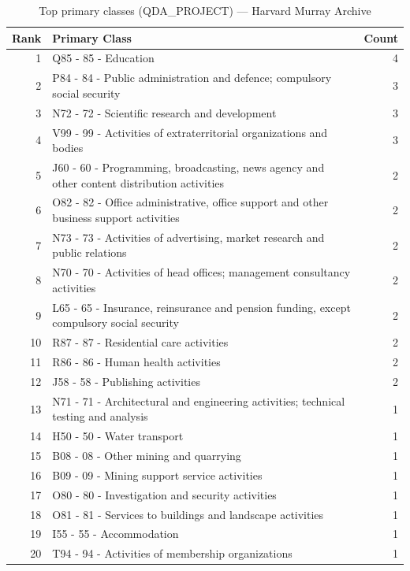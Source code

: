 \begin{table}[H]
    \centering
    \begin{tabular}{r p{10cm} r}
    \hline
    \textbf{Rank} & \textbf{Primary Class} & \textbf{Count} \\
    \hline
    1 & Q85 - 85 - Education & 4 \\
    2 & P84 - 84 - Public administration and defence; compulsory social security & 3 \\
    3 & N72 - 72 - Scientific research and development & 3 \\
    4 & V99 - 99 - Activities of extraterritorial organizations and bodies & 3 \\
    5 & J60 - 60 - Programming, broadcasting, news agency and other content distribution activities & 2 \\
    6 & O82 - 82 - Office administrative, office support and other business support activities & 2 \\
    7 & N73 - 73 - Activities of advertising, market research and public relations & 2 \\
    8 & N70 - 70 - Activities of head offices; management consultancy activities & 2 \\
    9 & L65 - 65 - Insurance, reinsurance and pension funding, except compulsory social security & 2 \\
    10 & R87 - 87 - Residential care activities & 2 \\
    11 & R86 - 86 - Human health activities & 2 \\
    12 & J58 - 58 - Publishing activities & 2 \\
    13 & N71 - 71 - Architectural and engineering activities; technical testing and analysis & 1 \\
    14 & H50 - 50 - Water transport & 1 \\
    15 & B08 - 08 - Other mining and quarrying & 1 \\
    16 & B09 - 09 - Mining support service activities & 1 \\
    17 & O80 - 80 - Investigation and security activities & 1 \\
    18 & O81 - 81 - Services to buildings and landscape activities & 1 \\
    19 & I55 - 55 - Accommodation & 1 \\
    20 & T94 - 94 - Activities of membership organizations & 1 \\
    \hline
    \end{tabular}
    \caption{Top primary classes (QDA\_PROJECT) --- Harvard Murray Archive}
\end{table}

